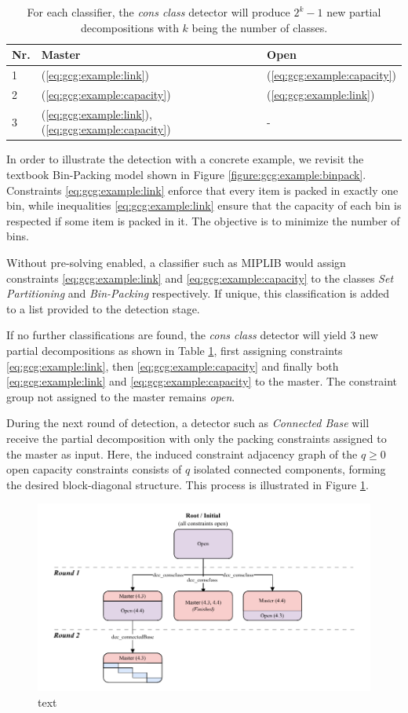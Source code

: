 		\begin{table}[ht!]
			\centering
			\begin{tabular}{l|l|l}
				\textbf{Nr.} & \textbf{Master} & \textbf{Open} \\
				\toprule
				\toprule
				1 & (\ref{eq:gcg:example:link}) & (\ref{eq:gcg:example:capacity}) \\ 
				2 & (\ref{eq:gcg:example:capacity}) & (\ref{eq:gcg:example:link}) \\
				3 & (\ref{eq:gcg:example:link}), (\ref{eq:gcg:example:capacity}) & -
			\end{tabular}
			\caption{For each classifier, the \textit{cons class} detector will produce $2^k - 1$ new partial decompositions with $k$ being the number of classes.}
			\label{table:gcg:example:consclass}
		\end{table}
		
		In order to illustrate the detection with a concrete example, we revisit the textbook Bin-Packing model shown in Figure \ref{figure:gcg:example:binpack}.
		Constraints \ref{eq:gcg:example:link} enforce that every item is packed in exactly one bin, while inequalities \ref{eq:gcg:example:link} ensure that the capacity of each bin is respected if some item is packed in it.
		The objective is to minimize the number of bins.
		
		Without pre-solving enabled, a classifier such as MIPLIB would assign constraints \ref{eq:gcg:example:link} and \ref{eq:gcg:example:capacity} to the classes \textit{Set Partitioning} and \textit{Bin-Packing} respectively.
		If unique, this classification is added to a list provided to the detection stage.
		
		If no further classifications are found, the \textit{cons class} detector will yield 3 new partial decompositions as shown in Table \ref{table:gcg:example:consclass}, first assigning constraints \ref{eq:gcg:example:link}, then \ref{eq:gcg:example:capacity} and finally both \ref{eq:gcg:example:link} and \ref{eq:gcg:example:capacity} to the master.
		The constraint group not assigned to the master remains \textit{open}.
		
		During the next round of detection, a detector such as \textit{Connected Base} will receive the partial decomposition with only the packing constraints assigned to the master as input.
		Here, the induced constraint adjacency graph of the $q \ge 0$ open capacity constraints consists of $q$ isolated connected components, forming the desired block-diagonal structure.
		This process is illustrated in Figure \ref{fig:gcg:example:consclass}.
		
		\begin{figure}[ht!]
			\centering
			\includegraphics{Bilder/DrawIO/example_tree}
			\caption{text}
			\label{fig:gcg:example:consclass}
		\end{figure}
		